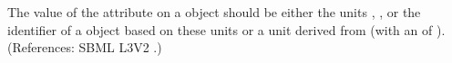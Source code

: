The value of the attribute  on a \Model object should be
either the units , , or the identifier of a
\UnitDefinition object based on these units or a unit derived from
 (with an  of ).  (References: SBML L3V2
.)
